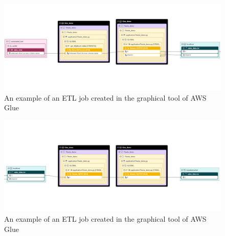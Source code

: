 \begin{figure}[ht]\centering
\includegraphics[angle=90,origin=c,height=1.0\textwidth]{img/thesis_demo2.PNG}
\caption{An example of an ETL job created in the graphical tool of AWS Glue}
\label{fig:thesisDemo2}
\end{figure}

\begin{figure}[ht]\centering
\includegraphics[angle=90,origin=c,height=1.0\textwidth]{img/thesis_demo3.PNG}
\caption{An example of an ETL job created in the graphical tool of AWS Glue}
\label{fig:thesisDemo3}
\end{figure}

